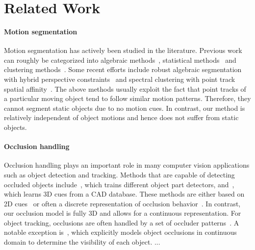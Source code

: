 \section{Related Work}
\label{sec:related}


\paragraph{Motion segmentation}
Motion segmentation has actively been studied in the literature. Previous work can roughly be categorized into algebraic methods~\cite{}, statistical methods~\cite{} and clustering methods~\cite{}. Some recent efforts include robust algebraic segmentation with hybrid perspective constraints~\cite{Rao_etal_2010} and spectral clustering with point track spatial affinity~\cite{Brox_Malik_2010}. The above methods usually exploit the fact that point tracks of a particular moving object tend to follow similar motion patterns. Therefore, they cannot segment static objects due to no motion cues. In contrast, our method is relatively independent of object motions and hence does not suffer from static objects. 

\paragraph{Occlusion handling}
Occlusion handling plays an important role in many computer vision applications such as object detection and tracking. Methods that are capable of detecting occluded objects include~\cite{}, which trains different object part detectors, and~\cite{}, which learns 3D cues from a CAD database. These methods are either based on 2D cues~\cite{} or often a discrete representation of occlusion behavior~\cite{}. In contrast, our occlusion model is fully 3D and allows for a continuous representation. For object tracking, occlusions are often handled by a set of occluder patterns~\cite{}. A notable exception is~\cite{}, which explicitly models object occlusions in continuous domain to determine the visibility of each object. ...

